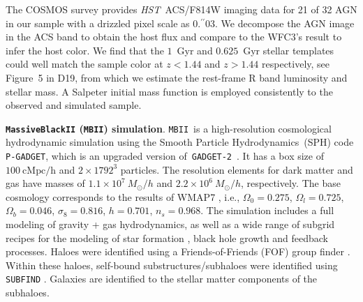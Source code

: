 \documentclass{natureprintstyle}
\newcommand{\hst}{{\it HST}}
\newcommand{\lhost}{$L_{\rm host}$}
\newcommand{\sersic}{S\'ersic}
\newcommand{\reff}{{$R_{\mathrm{eff}}$}}
\newcommand{\mstar}{{$M_*$}}
\newcommand{\farcs}{\mbox{\ensuremath{.\!\!^{\prime\prime}}}}%
\newcommand{\mbii}{\texttt{MBII}}
\begin{document}
The COSMOS survey provides \hst\ ACS/F814W imaging data for 21 of 32 AGN in our sample with a drizzled pixel scale as 0\farcs03. We decompose the AGN image in the ACS band to obtain the host flux and compare to the WFC3's result to infer the host color. We find that the $1$~Gyr and $0.625$~Gyr stellar templates could well match the sample color at $z<1.44$ and $z>1.44$ respectively, see Figure~5 in D19, from which we estimate the rest-frame R band luminosity and stellar mass. A Salpeter initial mass function is employed consistently to the observed and simulated sample.



\textbf{\texttt{MassiveBlackII} (\mbii) simulation}.  
\mbii\ is a high-resolution cosmological hydrodynamic simulation using the Smooth Particle Hydrodynamics~(SPH) code \texttt{P-GADGET}, which is an upgraded version of~\texttt{GADGET-2}~\cite{2005MNRAS.364.1105S}. It has a box size of $100~\mathrm{cMpc/h}$ and $2\times1792^3$ particles. The resolution elements for dark matter and gas have masses of $1.1\times 10^7~M_{\odot}/h$ and $2.2\times 10^6~M_{\odot}/h$, respectively. The base cosmology corresponds to the results of WMAP7 \cite{2011ApJS..192...18K}, i.e., $\Omega_0=0.275$, $\Omega_l=0.725$, $\Omega_b=0.046$, $\sigma_8=0.816$, $h = 0.701$, $n_s=0.968$.  The simulation includes a full modeling of gravity + gas hydrodynamics, as well as a wide range of subgrid recipes for the modeling of star formation \cite{2003MNRAS.339..289S}, black hole growth and feedback processes. Haloes were identified using a Friends-of-Friends (FOF) group finder \cite{1985ApJ...292..371D}. Within these haloes, self-bound substructures/subhaloes were identified using \texttt{SUBFIND} \cite{2005MNRAS.364.1105S}. Galaxies are identified to the stellar matter components of the subhaloes.
\end{document}
